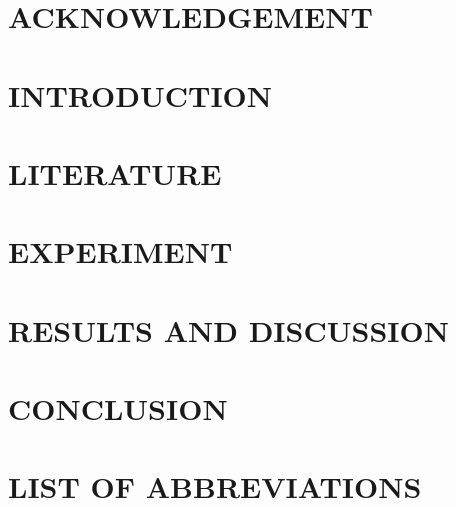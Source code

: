 \documentclass[a4paper,12pt]{article}
\begin{document}
\pagestyle{empty}



\newpage


\newpage
\section*{ACKNOWLEDGEMENT}


\newpage
\tableofcontents

\newpage
\pagestyle{plain}
\section{INTRODUCTION}

\label{chap:Introduction}
\clearpage

\newpage
\section{LITERATURE}

\label{chap:Literary part}
\clearpage

\newpage
\section{EXPERIMENT}

\label{chap:Experimental part}
\clearpage

\newpage
\section{RESULTS AND DISCUSSION}

\label{chap:Results}
\clearpage

\newpage
\section{CONCLUSION}

\label{chap:Conclusion}
\clearpage

\newpage
\section*{LIST OF ABBREVIATIONS}


\clearpage
\listoffigures

\clearpage
\listoftables

\newpage
\end{document}
